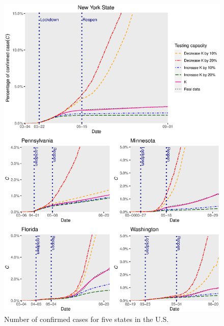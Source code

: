 \documentclass[nonblindrev, copyedit]{informs3a}
\begin{document}
\begin{figure}[htbp]
	\centering
 	\caption{Number of confirmed cases for five states in the U.S.}
 	\label{fig:all states}
	\includegraphics[width=0.8\linewidth, angle=0]{fivestates_1.eps}
\end{figure}
\end{document}
